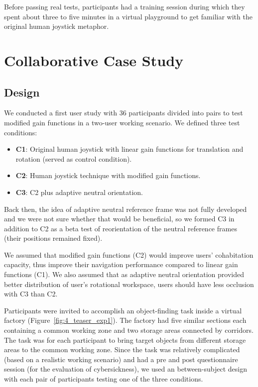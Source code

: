 Before passing real tests, participants had a training session during which they spent about three to five minutes in a virtual playground to get familiar with the original human joystick metaphor.

\section{Collaborative Case Study}
\subsection{Design}
We conducted a first user study \citep{Chen2015Cohab} with 36 participants divided into pairs to test modified gain functions in a two-user working scenario. We defined three test conditions:

\begin{itemize}
  \item \textbf{C1}: Original human joystick with linear gain functions for translation and rotation (served as control condition).
  \item \textbf{C2}: Human joystick technique with modified gain functions.
  \item \textbf{C3}: C2 plus adaptive neutral orientation.
\end{itemize}

Back then, the idea of adaptive neutral reference frame was not fully developed and we were not sure whether that would be beneficial, so we formed C3 in addition to C2 as a beta test of reorientation of the neutral reference frames (their positions remained fixed).

We assumed that modified gain functions (C2) would improve users' cohabitation capacity, thus improve their navigation performance compared to linear gain functions (C1). We also assumed that as adaptive neutral orientation provided better distribution of user's rotational workspace, users should have less occlusion with C3 than C2.

Participants were invited to accomplish an object-finding task inside a virtual factory (Figure~\ref{fig:4_teaser_exp1}). The factory had five similar sections each containing a common working zone and two storage areas connected by corridors. The task was for each participant to bring target objects from different storage areas to the common working zone. Since the task was relatively complicated (based on a realistic working scenario) and had a pre and post questionnaire session (for the evaluation of cybersickness), we used an between-subject design with each pair of participants testing one of the three conditions.

